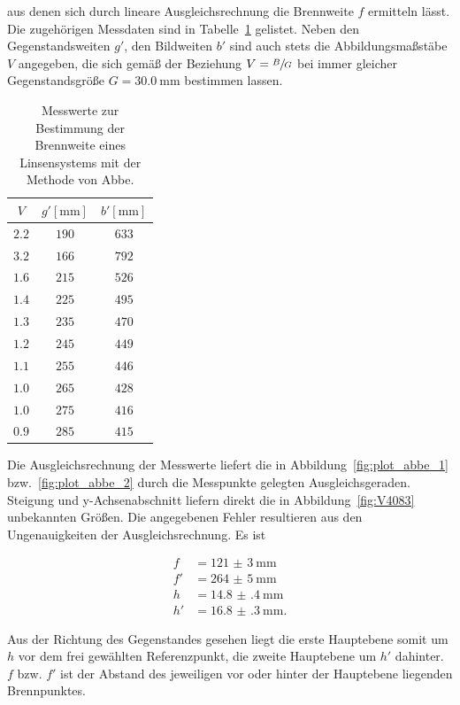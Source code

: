\documentclass[
  parskip=half,
  bibliography=totoc,     %
  captions=tableheading,  %
  titlepage=firstiscover, %
]{scrartcl}
\begin{document}
aus denen sich durch lineare Ausgleichsrechnung die Brennweite $f$ ermitteln lässt. Die zugehörigen
Messdaten sind in Tabelle~\ref{tab:abbe} gelistet. Neben den Gegenstandsweiten $g'$, den
Bildweiten $b'$ sind auch stets die Abbildungsmaßstäbe $V$ angegeben, die sich
gemäß der Beziehung $V=\sfrac{B}{G}$ bei immer gleicher Gegenstandsgröße $G=\SI{30.0}{\milli\metre}$
bestimmen lassen.

\begin{table}[htp]
	\begin{center}
	\caption{Messwerte zur Bestimmung der Brennweite eines Linsensystems mit der Methode von Abbe.}
	\label{tab:abbe}
		\begin{tabular}{ccc}
			\toprule
			 {$V$} & {$g'[\si{\milli\metre}]$} & {$b'[\si{\milli\metre}]$}\\
			\midrule
			$2.2$ & $190$ & $633$\\
			$3.2$ & $166$ & $792$\\
			$1.6$ & $215$ & $526$\\
			$1.4$ & $225$ & $495$\\
			$1.3$ & $235$ & $470$\\
			$1.2$ & $245$ & $449$\\
			$1.1$ & $255$ & $446$\\
			$1.0$ & $265$ & $428$\\
			$1.0$ & $275$ & $416$\\
			$0.9$ & $285$ & $415$\\
			\bottomrule
		\end{tabular}
	\end{center}
\end{table}


Die Ausgleichsrechnung der Messwerte liefert die in Abbildung~\ref{fig:plot_abbe_1}
bzw.~\ref{fig:plot_abbe_2} durch die Messpunkte gelegten Ausgleichsgeraden. Steigung und
y-Achsenabschnitt liefern direkt die in Abbildung~\ref{fig:V4083} unbekannten Größen. Die angegebenen
Fehler resultieren aus den Ungenauigkeiten der Ausgleichsrechnung. Es ist

\begin{align*}
    f  &= \SI{121(3)}{\milli\metre}\\
    f' &= \SI{264(5)}{\milli\metre}\\
    h  &= \SI{14.8(4)}{\milli\metre}\\
    h' &= \SI{16.8(3)}{\milli\metre}.
\end{align*}

Aus der Richtung des Gegenstandes gesehen liegt die erste Hauptebene somit um $h$ vor dem frei gewählten
Referenzpunkt, die zweite Hauptebene um $h'$ dahinter. $f$ bzw. $f'$ ist der Abstand des jeweiligen vor
oder hinter der Hauptebene liegenden Brennpunktes.
\end{document}
